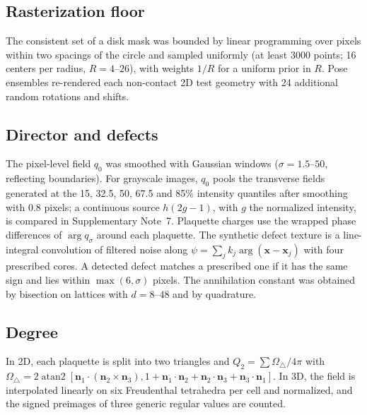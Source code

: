 \documentclass[11pt,a4paper]{article}
\newcommand{\nn}{\bm n}
\begin{document}
\subsection*{Rasterization floor}
The consistent set of a disk mask was bounded by linear programming over pixels within two spacings of the circle and sampled uniformly (at least 3000 points; 16 centers per radius, $R=4$--$26$), with weights $1/R$ for a uniform prior in $R$. Pose ensembles re-rendered each non-contact 2D test geometry with 24 additional random rotations and shifts.

\subsection*{Director and defects}
The pixel-level field $q_0$ was smoothed with Gaussian windows ($\sigma=1.5$--$50$, reflecting boundaries). For grayscale images, $q_0$ pools the transverse fields generated at the 15, 32.5, 50, 67.5 and 85\% intensity quantiles after smoothing with $0.8$ pixels; a continuous source $h(2g-1)$, with $g$ the normalized intensity, is compared in Supplementary Note~7. Plaquette charges use the wrapped phase differences of $\arg q_\sigma$ around each plaquette. The synthetic defect texture is a line-integral convolution of filtered noise along $\psi=\sum_jk_j\arg(\bm x-\bm x_j)$ with four prescribed cores. A detected defect matches a prescribed one if it has the same sign and lies within $\max(6,\sigma)$ pixels. The annihilation constant was obtained by bisection on lattices with $d=8$--$48$ and by quadrature.

\subsection*{Degree}
In 2D, each plaquette is split into two triangles and $Q_2=\sum\Omega_\triangle/4\pi$ with $\Omega_\triangle=2\operatorname{atan2}[\nn_1\cdot(\nn_2\times\nn_3),1+\nn_1\cdot\nn_2+\nn_2\cdot\nn_3+\nn_3\cdot\nn_1]$. In 3D, the field is interpolated linearly on six Freudenthal tetrahedra per cell and normalized, and the signed preimages of three generic regular values are counted.
\end{document}
